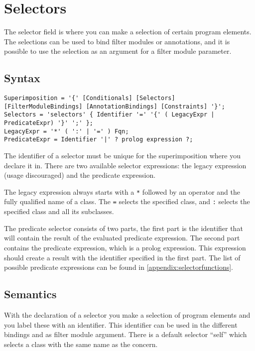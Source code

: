 \chapter{Selectors} \label{chapter:selector}
The selector field is where you can make a selection of certain program elements. The selections
can be used to bind filter modules or annotations, and it is possible to use the selection as an argument for a filter module parameter.

\section{Syntax} %
\begin{lstlisting}[caption = {Selector syntax}, label = lst::ARM:sel:syntax, style = listing, language = ebnf, float = tpb]
Superimposition = '{' [Conditionals] [Selectors] [FilterModuleBindings] [AnnotationBindings] [Constraints] '}';
Selectors = 'selectors' { Identifier '=' '{' ( LegacyExpr | PredicateExpr) '}' ';' };
LegacyExpr = '*' ( ':' | '=' ) Fqn;
PredicateExpr = Identifier '|' ? prolog expression ?;
\end{lstlisting}

The identifier of a selector must be unique for the superimposition where you declare it in. 
There are two available selector expressions: the legacy expression (usage discouraged) and the predicate expression.

The legacy expression always starts with a \lstinline|*| followed by an operator and the fully qualified name of a class.
The \lstinline|=| selects the specified class, and \lstinline|:| selects the specified class and all its subclasses.

The predicate selector consists of two parts, the first part is the identifier that will contain the result of the evaluated predicate expression. 
The second part contains the predicate expression, which is a prolog expression.
This expression should create a result with the identifier specified in the first part.
The list of possible predicate expressions can be found in \autoref{appendix:selectorfunctions}.

\section{Semantics}
With the declaration of a selector you make a selection of program elements and you label these with an identifier.
This identifier can be used in the different bindings and as filter module argument. 
There is a default selector ``self'' which selects a class with the same name as the concern.

